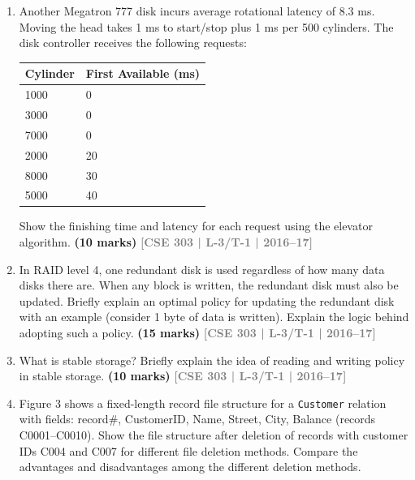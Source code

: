 \documentclass[12pt,a3paper]{article}
\newcommand{\yr}[1]{\hfill\textcolor{gray}{\small\textbf{[#1]}}}
\newcommand{\mk}[1]{\textcolor{orange!70!black}{\small\textbf{(#1 marks)}}}
\begin{document}
\begin{enumerate}
\item Another Megatron 777 disk incurs average rotational latency of 8.3 ms. Moving the head takes 1 ms to start/stop plus 1 ms per 500 cylinders. The disk controller receives the following requests:

\medskip
\begin{center}
\begin{tabular}{ll}
\toprule
\textbf{Cylinder} & \textbf{First Available (ms)}\\
\midrule
1000 & 0\\
3000 & 0\\
7000 & 0\\
2000 & 20\\
8000 & 30\\
5000 & 40\\
\bottomrule
\end{tabular}
\end{center}
Show the finishing time and latency for each request using the elevator algorithm.
  \mk{10} \yr{CSE 303 | L-3/T-1 | 2016--17}

\item In RAID level 4, one redundant disk is used regardless of how many data disks there are. When any block is written, the redundant disk must also be updated. Briefly explain an optimal policy for updating the redundant disk with an example (consider 1 byte of data is written). Explain the logic behind adopting such a policy.
\mk{15} \yr{CSE 303 | L-3/T-1 | 2016--17}

\item What is stable storage? Briefly explain the idea of reading and writing policy in stable storage.
\mk{10} \yr{CSE 303 | L-3/T-1 | 2016--17}

\item Figure 3 shows a fixed-length record file structure for a \texttt{Customer} relation with fields: record\#, CustomerID, Name, Street, City, Balance (records C0001--C0010). Show the file structure after deletion of records with customer IDs C004 and C007 for different file deletion methods. Compare the advantages and disadvantages among the different deletion methods.


\end{enumerate}
\end{document}
